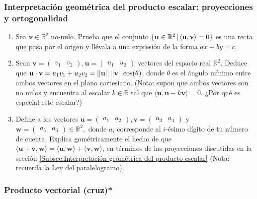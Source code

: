 \documentclass[12pt,dvipsnames]{article}
\begin{document}
\subsubsection{Interpretación geométrica del producto escalar: proyecciones y ortogonalidad}
\begin{enumerate}
\item Sea $\mathbf{v}\in\mathbb{R}^2$ no-nulo. Prueba que el conjunto $\{\mathbf{u}\in\mathbb{R}^2\hspace{0.5mm} |\hspace{0.5mm} \langle\mathbf{u},\mathbf{v}\rangle =0\}$ es una recta que pasa por el origen y llévala a una expresión de la forma $ax+by=c.$ 
    \item Sean $\mathbf{v}=\begin{pmatrix} v_1 & v_2 \end{pmatrix}, \mathbf{u}=\begin{pmatrix}u_1 & u_2 \end{pmatrix}$ vectores del espacio real $\mathbb{R}^2.$ Deduce que $\mathbf{u}\cdot\mathbf{v}=u_1v_1+u_2v_2=||\mathbf{u}||\hspace{0.5mm}||\mathbf{v}||\cos(\theta)$, donde $\theta$ es el ángulo mínimo entre ambos vectores en el plano cartesiano. (Nota: supon que ambos vectores son no nulos y encuentra al escalar $k\in\mathbb{R}$ tal que $\langle\mathbf{u},\mathbf{u}-k\mathbf{v}\rangle=0$. ¿Por qué es especial este escalar?) 
    \item Define a los vectores $\mathbf{u}=\begin{pmatrix} a_1 & a_2 \end{pmatrix}, \mathbf{v}=\begin{pmatrix} a_3 & a_4\end{pmatrix}$ y $\mathbf{w}=\begin{pmatrix} a_5 & a_6\end{pmatrix}\in\mathbb{R}^2,$ donde $a_i$ corresponde al $i$-ésimo dígito de tu número de cuenta. Explica gométricamente el hecho de que $\langle\mathbf{u}+\mathbf{v},\mathbf{w}\rangle=\langle\mathbf{u},\mathbf{w}\rangle+\langle\mathbf{v},\mathbf{w}\rangle$, en términos de las proyecciones discutidas en la sección \ref{Subsec:Interpretación geométrica del producto escalar} (Nota: recuerda la Ley del paralelogramo). 
\end{enumerate}

\subsubsection{Producto vectorial (cruz)*}
\end{document}
